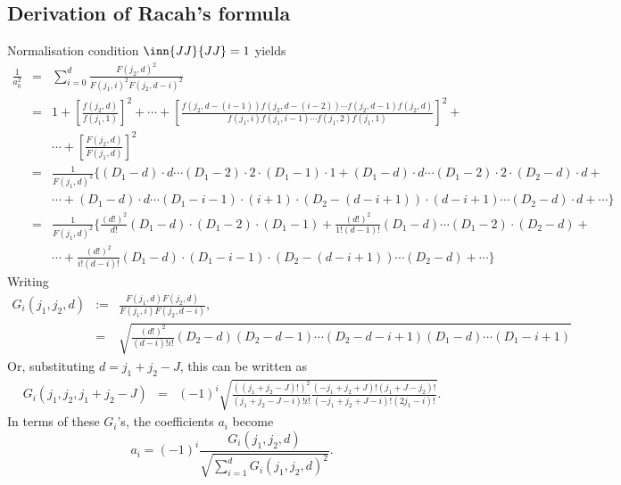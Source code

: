 \documentclass{article}
\begin{document}
{\subsection{Derivation of Racah's formula}
\label{sec-5-2}
Normalisation condition $\inn{JJ}{JJ}=1$ yields
\begin{eqnarray}
 \frac{1}{a_{0}^2} & = & \sum_{i=0}^{d}\frac{F(j_2,d)^2}{F(j_1,i)^2F(j_2,d-i)^2}\\
                   & = & 1+\left[ \frac{f(j_2,d)}{f(j_1,1)} \right]^2+ \cdots + \left[\frac{f(j_2,d-(i-1))f(j_2,d-(i-2)) \cdots f(j_2,d-1)f(j_2,d)}{f(j_1,i)f(j_1,i-1) \cdots f(j_1,2)f(j_1,1)}\right]^2 + \nonumber\\
                   & &   \cdots + \left[\frac{F(j_2,d)}{F(j_1,d)} \right]^2 \nonumber\\
                   & = & \frac{1}{F(j_1,d)^2} \bigg\{ (D_1-d)\cdot d\cdots (D_1-2)\cdot 2 \cdot (D_1 -1) \cdot 1 +(D_1-d)\cdot d\cdots (D_1-2)\cdot 2 \cdot (D_2-d)\cdot d + \nonumber\\
                   & &   \cdots + (D_1-d)\cdot d\cdots (D_1-i-1)\cdot (i+1) \cdot (D_2 -(d-i+1)) \cdot (d-i+1) \cdots (D_2-d)\cdot d + \cdots \bigg\} \nonumber\\
                   & = & \frac{1}{F(j_1,d)^2} \bigg\{ \frac{(d!)^2}{d!}(D_1-d)\cdot  (D_1-2)\cdot  (D_1 -1)  + \frac{(d!)^2}{1!(d-1)!}(D_1-d)\cdots (D_1-2) \cdot (D_2-d) + \nonumber\\
                   & &   \cdots + \frac{(d!)^2}{i!(d-i)!}(D_1-d)\cdot (D_1-i-1) \cdot (D_2 -(d-i+1)) \cdots (D_2-d) + \cdots \bigg\} \nonumber
\end{eqnarray}
Writing 
\begin{eqnarray}
 G_i(j_1,j_2,d) &:=& \frac{F(j_1,d)F(j_2,d)}{F(j_1,i)F(j_2,d-i)}, \\
                & = & \sqrt{\frac{(d!)^2}{(d-i)!i!}(D_2 - d)(D_2 -d-1)\cdots(D_2 - d -i+1)(D_1 - d) \cdots (D_1 - i +1)} \nonumber
\end{eqnarray}
Or, substituting  $d = j_1+j_2 -J$, this can be written as
\begin{eqnarray}
G_i(j_1,j_2,j_1+j_2 -J) & = & (-1)^i\sqrt{\frac{((j_1+j_2 -J)!)^2}{(j_1+j_2-J-i)!i!}\frac{(-j_1+j_2+J)!(j_1+J-j_2)!}{(-j_1+j_2+J -i)!(2j_1  - i)!}}. \nonumber
\end{eqnarray}
In terms of these $G_i$'s, the coefficients $a_i$ become
\begin{equation}
\label{ }
a_i = (-1)^i\frac{G_i(j_1,j_2,d)}{\sqrt{\sum_{i=1}^{d}G_i(j_1,j_2,d)^2}}.
\end{equation}
}
\end{document}

